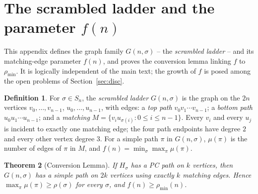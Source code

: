 \documentclass[11pt]{article}
\newtheorem{theorem}{Theorem}[section]
\theoremstyle{definition}
\newtheorem{definition}[theorem]{Definition}
\newcommand{\pmin}{\rho_{\min}}
\begin{document}

\section{The scrambled ladder and the parameter
\texorpdfstring{$f(n)$}{f(n)}}\label{sec:conversion}

This appendix defines the graph family $G(n,\sigma)$ -- the \emph{scrambled
ladder} -- and its matching-edge parameter $f(n)$, and proves the conversion
lemma linking $f$ to $\pmin$. It is logically independent of the main text;
the growth of $f$ is posed among the open problems of Section~\ref{sec:disc}.

\begin{definition}\label{def:Gns}
For $\sigma \in S_n$, the \emph{scrambled ladder} $G(n,\sigma)$ is the graph on the
$2n$ vertices $v_0,\dots,v_{n-1}$, $u_0,\dots,u_{n-1}$, with edges:
a \emph{top path} $v_0 v_1 \cdots v_{n-1}$; a \emph{bottom path}
$u_0 u_1 \cdots u_{n-1}$; and a \emph{matching} $M = \{v_i u_{\sigma(i)} : 0\le i\le
n-1\}$. Every $v_i$ and every $u_j$ is incident to exactly one matching edge; the four
path endpoints have degree $2$ and every other vertex degree $3$. For a simple path
$\pi$ in $G(n,\sigma)$, $\mu(\pi)$ is the number of edges of $\pi$ in $M$, and
$f(n) = \min_\sigma \max_\pi \mu(\pi)$.
\end{definition}

\begin{theorem}[Conversion Lemma]\label{thm:conversion}
If $H_\sigma$ has a PC path on $k$ vertices, then $G(n,\sigma)$ has a simple path on
$2k$ vertices using exactly $k$ matching edges. Hence $\max_\pi \mu(\pi) \ge
\rho(\sigma)$ for every $\sigma$, and $f(n) \ge \pmin(n)$.
\end{theorem}
\end{document}

